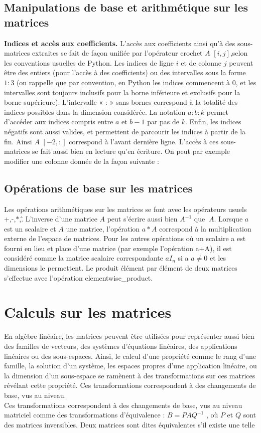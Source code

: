 \subsection{ Manipulations de base et arithmétique sur les matrices}
\begin{flushright}
\textbf{Indices et accès aux coefficients.} L'accès aux coefficients ainsi qu’à des
sous-matrices extraites se fait de façon unifiée par l’opérateur crochet $A$ $\left[i, j\right]$,selon les 
conventions usuelles de Python. Les indices de ligne $i$ et de colonne $j$ peuvent être des entiers (pour 
l’accès à des coefficients) ou des intervalles sous la forme $1:3$ (on rappelle que par convention, en Python 
les indices commencent à $0$, et les intervalles sont toujours inclusifs pour la borne inférieure et exclusifs 
pour la borne supérieure). L’intervalle « : » sans bornes correspond à la totalité des indices possibles dans la 
dimension considérée. La notation $a:b:k$ permet d’accéder aux indices compris entre $a$ et $b-1$ par pas de 
$k$. Enfin, les indices négatifs sont aussi valides, et permettent de parcourir les indices à partir de la
fin. Ainsi $A$ $\left[-2,:\right]$ correspond à l’avant dernière ligne. L'accès à ces sous-matrices
se fait aussi bien en lecture qu’en écriture. On peut par exemple modifier une colonne donnée de la façon 
suivante :
\end{flushright}

\subsection{ Opérations de base sur les matrices}
Les opérations arithmétiques sur les matrices se font avec les opérateurs usuels +,-,$\ast$,\^. L’inverse 
d’une matrice $A$ peut s’écrire aussi bien $A^{-1}$ que $~A$. Lorsque $a$ est un scalaire et $A$ une matrice, 
l’opération $a*A$ correspond à la multiplication externe de l’espace de matrices. Pour les autres opérations où 
un scalaire a est fourni en lieu et place d’une matrice (par exemple l’opération a+A), il est considéré comme la 
matrice scalaire correspondante $aI_{n}$ si a $a\neq 0$ et les dimensions le permettent. Le produit élément par 
élément de deux matrices s’effectue avec l’opération elementwise\_product.
\section{ Calculs sur les matrices}
En algèbre linéaire, les matrices peuvent être utilisées pour représenter aussi bien des familles de vecteurs, 
des systèmes d’équations linéaires, des applications linéaires ou des sous-espaces. Ainsi, le calcul d’une 
propriété comme le rang d’une famille, la solution d’un système, les espaces propres d’une application linéaire, 
ou la dimension d’un sous-espace se ramènent à des transformations sur ces matrices révélant cette propriété. 
Ces transformations correspondent à des changements de base, vus au niveau.
\\
Ces transformations correspondent à des changements de base, vus au niveau
matriciel comme des transformations d’équivalence : $B = PAQ^{-1}$ , où $P$ et $Q$ sont
des matrices inversibles. Deux matrices sont dites équivalentes s’il existe une telle

